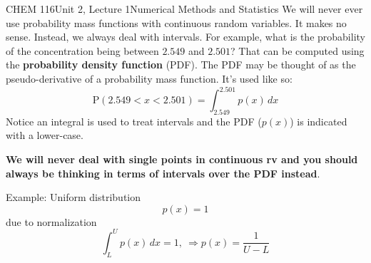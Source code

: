 \documentclass{article}
\renewcommand{\Pr}{\textrm{P}}
\begin{document}
\begin{tdoc}{CHEM 116}{Unit 2, Lecture 1}{Numerical Methods and Statistics}
We will never ever use probability mass functions with continuous
random variables. It makes no sense. Instead, we always deal with
intervals. For example, what is the probability of the concentration
being between $2.549$ and $2.501$? That can be computed using the {\bf
  probability density function} (PDF). The PDF may be thought of as
the pseudo-derivative of a probability mass function. It's used like so:
\[
\Pr(2.549 < x < 2.501) = \int_{2.549}^{2.501} p(x)\,dx
\]
Notice an integral is used to treat intervals and the PDF ($p(x)$) is
indicated with a lower-case. 

{\bf We will never deal with single points in continuous rv and you
  should always be thinking in terms of intervals over the PDF
  instead}.

Example: Uniform distribution
\[
p(x) = 1
\]
due to normalization
\[
\int_L^U p(x) \,dx = 1,\:\Rightarrow p(x) = \frac{1}{U-L}
\]


\end{tdoc}
\end{document}

